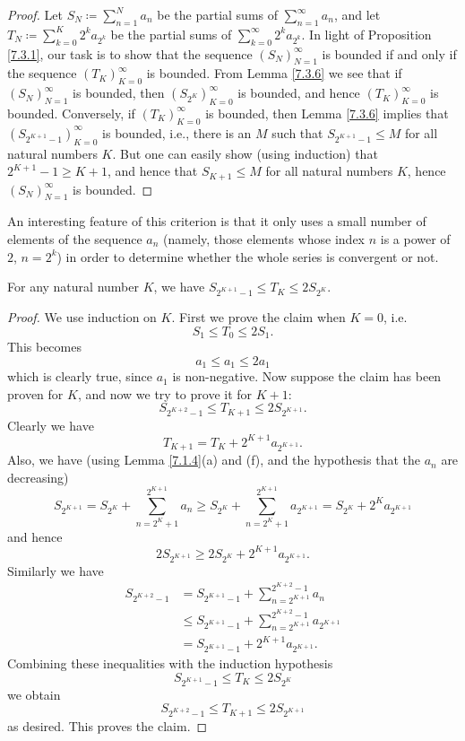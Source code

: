 \begin{proof}
Let \(S_N \coloneqq \sum_{n = 1}^N a_n\) be the partial sums of \(\sum_{n = 1}^\infty a_n\), and let \(T_N \coloneqq \sum_{k = 0}^K 2^k a_{2^k}\) be the partial sums of \(\sum_{k = 0}^\infty 2^k a_{2^k}\).
In light of Proposition \ref{7.3.1}, our task is to show that the sequence \((S_N)_{N = 1}^\infty\) is bounded if and only if the sequence \((T_K)_{K = 0}^\infty\) is bounded.
From Lemma \ref{7.3.6} we see that if \((S_N)_{N = 1}^\infty\) is bounded, then \((S_{2^K})_{K = 0}^\infty\) is bounded, and hence \((T_K)_{K = 0}^\infty\) is bounded.
Conversely, if \((T_K)_{K = 0}^\infty\) is bounded, then Lemma \ref{7.3.6} implies that \((S_{2^{K + 1} - 1})_{K = 0}^\infty\) is bounded, i.e., there is an \(M\) such that \(S_{2^{K + 1} - 1} \leq M\) for all natural numbers \(K\).
But one can easily show (using induction) that \(2^{K + 1} - 1 \geq K + 1\), and hence that \(S_{K + 1} \leq M\) for all natural numbers \(K\), hence \((S_N)_{N = 1}^\infty\) is bounded.
\end{proof}

\begin{remark}\label{7.3.5}
An interesting feature of this criterion is that it only uses a small number of elements of the sequence \(a_n\)
(namely, those elements whose index \(n\) is a power of \(2\), \(n = 2^k\))
in order to determine whether the whole series is convergent or not.
\end{remark}

\begin{lemma}\label{7.3.6}
For any natural number \(K\), we have \(S_{2^{K + 1} - 1} \leq T_K \leq 2S_{2^K}\).
\end{lemma}

\begin{proof}
We use induction on \(K\).
First we prove the claim when \(K = 0\), i.e.
\[
    S_1 \leq T_0 \leq 2S_1.
\]
This becomes
\[
    a_1 \leq a_1 \leq 2a_1
\]
which is clearly true, since \(a_1\) is non-negative.
Now suppose the claim has been proven for \(K\), and now we try to prove it for \(K + 1\):
\[
    S_{2^{K + 2} - 1} \leq T_{K + 1} \leq 2S_{2^{K + 1}}.
\]
Clearly we have
\[
    T_{K + 1} = T_K + 2^{K + 1} a_{2^{K + 1}}.
\]
Also, we have
(using Lemma \ref{7.1.4}(a) and (f), and the hypothesis that the \(a_n\) are decreasing)
\[
    S_{2^{K + 1}} = S_{2^K} + \sum_{n = 2^K + 1}^{2^{K + 1}} a_n \geq S_{2^K} + \sum_{n = 2^K + 1}^{2^{K + 1}} a_{2^{K + 1}} = S_{2^K} + 2^K a_{2^{K + 1}}
\]
and hence
\[
    2S_{2^{K + 1}} \geq 2S_{2^K} + 2^{K + 1} a_{2^{K + 1}}.
\]
Similarly we have
\begin{align*}
S_{2^{K + 2} - 1} &= S_{2^{K + 1} - 1} + \sum_{n = 2^{K + 1}}^{2^{K + 2} - 1} a_n \\
&\leq S_{2^{K + 1} - 1} + \sum_{n = 2^{K + 1}}^{2^{K + 2} - 1} a_{2^{K + 1}} \\
&= S_{2^{K + 1} - 1} + 2^{K + 1} a_{2^{K + 1}}.
\end{align*}
Combining these inequalities with the induction hypothesis
\[
    S_{2^{K + 1} - 1} \leq T_K \leq 2S_{2^K}
\]
we obtain
\[
    S_{2^{K + 2} - 1} \leq T_{K + 1} \leq 2S_{2^{K + 1}}
\]
as desired.
This proves the claim.
\end{proof}

